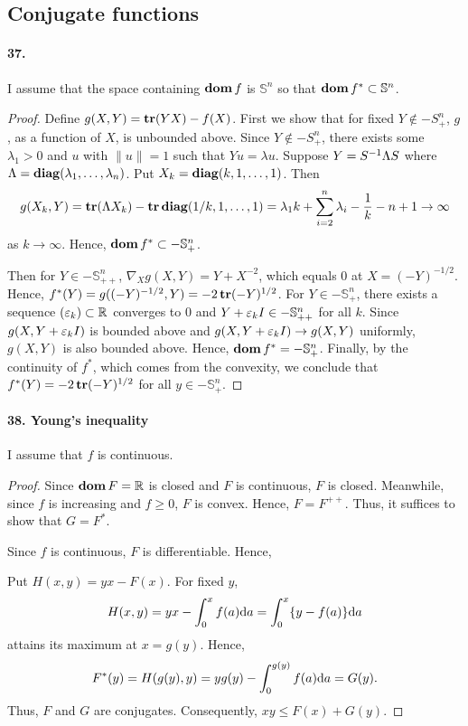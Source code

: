 \subsection{Conjugate functions}
  \paragraph{37.}
    I assume that the space containing $\operatorname{\mathbf{dom}} f$ is $\mathbb{S}^n$ so that $\operatorname{\mathbf{dom}}
    f^*\subset\mathbb{S}^n$.
  \begin{proof}
    Define $g(X, Y)=\operatorname{\mathbf{tr}}(YX)-f(X)$. First we show that for fixed $Y\notin-S^n_+$, 
    $g$, as a function of $X$, is unbounded above. Since $Y\notin -S^n_+$, there
    exists some $\lambda_1>0$ and $u$ with $\|u\|=1$ such that $Yu=\lambda u$.
    Suppose $Y=S^{-1}\Lambda S$ where $\Lambda=\operatorname{\mathbf{diag}}(\lambda_1,\dots,\lambda_n)$.
    Put $X_k=\operatorname{\mathbf{diag}}(k,1,\dots,1)$. Then
    \[
      g(X_k,Y)=\operatorname{\mathbf{tr}}(\Lambda X_k)-\operatorname{\mathbf{tr}}\operatorname{\mathbf{diag}}(1/k,1,\dots,1)=
      \lambda_1k+\sum_{i=2}^n\lambda_i-\frac{1}{k}-n+1\to\infty
    \]
    as $k\to\infty$. Hence, $\operatorname{\mathbf{dom}} f^*\subset-\mathbb{S}^n_+$.\par
    Then for $Y\in-\mathbb{S}^n_{++}$, $\nabla_X g(X,Y)=Y+X^{-2}$, which equals
    $0$ at $X=(-Y)^{-1/2}$. Hence, $f^*(Y)=g((-Y)^{-1/2}, Y)=-2\operatorname{\mathbf{tr}}(-Y)^{1/2}$.
    For $Y\in-\mathbb{S}^n_+$, there exists a sequence $(\varepsilon_k)\subset
    \mathbb{R}$ converges to $0$ and $Y+\varepsilon_kI\in-\mathbb{S}^n_{++}$ for all 
    $k$. Since $g(X,Y+\varepsilon_k I)$ is bounded above and $g(X,Y+\varepsilon_k I)\to g(X,
    Y)$ uniformly, $g(X,Y)$ is also bounded above. Hence, $\operatorname{\mathbf{dom}} f^*=-\mathbb{S}
    ^n_+$. Finally, by the continuity of $f^*$, which comes from the convexity,
    we conclude that $f^*(Y)=-2\operatorname{\mathbf{tr}}(-Y)^{1/2}$ for all $y\in-\mathbb{S}^n_+$.
  \end{proof}
  
  \paragraph{38. Young's inequality}
    I assume that $f$ is continuous.
  \begin{proof}
    Since $\operatorname{\mathbf{dom}} F=\mathbb{R}$ is closed and $F$ is continuous, $F$ is closed.
    Meanwhile, since $f$ is increasing and $f\ge 0$, $F$ is convex. Hence, $F=
    F^{++}$. Thus, it suffices to show that $G=F^*$.\par
    Since $f$ is continuous, $F$ is differentiable. Hence, 
    
    Put $H(x,y)=yx-F(x)$. For fixed $y$,
    \[
      H(x,y)=yx-\int_0^xf(a)\mathrm{d} a=\int_0^x\{y-f(a)\}\mathrm{d} a
    \]
    attains its maximum at $x=g(y)$. Hence,
    \begin{align*}
      F^*(y)=H(g(y), y)=yg(y)-\int_0^{g(y)}f(a)\mathrm{d} a
      =G(y).
    \end{align*}
    Thus, $F$ and $G$ are conjugates. Consequently, $xy\le F(x)+G(y)$.
  \end{proof}
  
